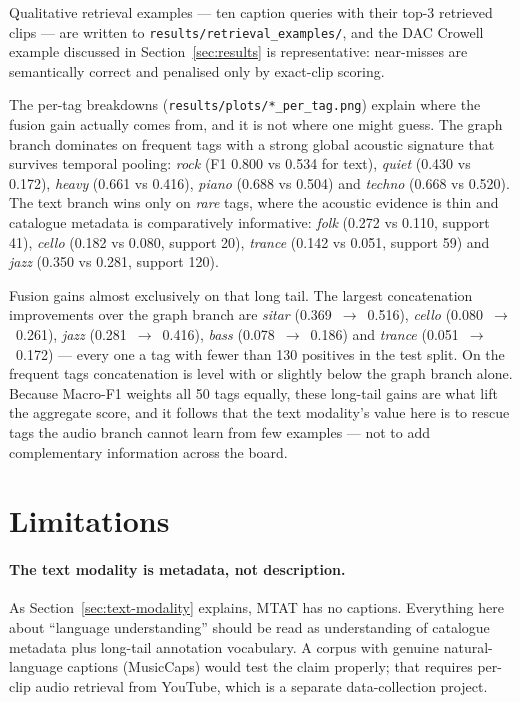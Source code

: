 \documentclass{article}
\begin{document}
Qualitative retrieval examples --- ten caption queries with their top-3
retrieved clips --- are written to \texttt{results/retrieval\_examples/}, and the
DAC Crowell example discussed in Section~\ref{sec:results} is representative:
near-misses are semantically correct and penalised only by exact-clip scoring.

The per-tag breakdowns (\texttt{results/plots/*\_per\_tag.png}) explain where the
fusion gain actually comes from, and it is not where one might guess. The graph
branch dominates on frequent tags with a strong global acoustic signature that
survives temporal pooling: \textit{rock} (F1 0.800 vs 0.534 for text),
\textit{quiet} (0.430 vs 0.172), \textit{heavy} (0.661 vs 0.416),
\textit{piano} (0.688 vs 0.504) and \textit{techno} (0.668 vs 0.520). The text
branch wins only on \emph{rare} tags, where the acoustic evidence is thin and
catalogue metadata is comparatively informative: \textit{folk} (0.272 vs 0.110,
support 41), \textit{cello} (0.182 vs 0.080, support 20), \textit{trance}
(0.142 vs 0.051, support 59) and \textit{jazz} (0.350 vs 0.281, support 120).

Fusion gains almost exclusively on that long tail. The largest concatenation
improvements over the graph branch are \textit{sitar} (0.369~$\rightarrow$~0.516),
\textit{cello} (0.080~$\rightarrow$~0.261), \textit{jazz}
(0.281~$\rightarrow$~0.416), \textit{bass} (0.078~$\rightarrow$~0.186) and
\textit{trance} (0.051~$\rightarrow$~0.172) --- every one a tag with fewer than
130 positives in the test split. On the frequent tags concatenation is level
with or slightly below the graph branch alone. Because Macro-F1 weights all 50
tags equally, these long-tail gains are what lift the aggregate score, and it
follows that the text modality's value here is to rescue tags the audio branch
cannot learn from few examples --- not to add complementary information across
the board.

\section{Limitations}
\label{sec:limitations}

\paragraph{The text modality is metadata, not description.} As
Section~\ref{sec:text-modality} explains, MTAT has no captions. Everything here
about ``language understanding'' should be read as understanding of catalogue
metadata plus long-tail annotation vocabulary. A corpus with genuine
natural-language captions (MusicCaps) would test the claim properly; that
requires per-clip audio retrieval from YouTube, which is a separate data-collection
project.
\end{document}
